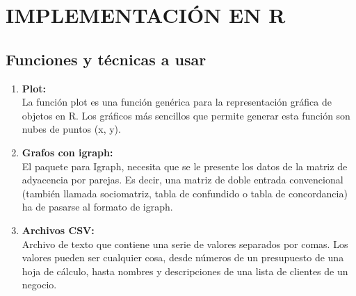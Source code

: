 \documentclass[journal]{IEEEtran}
\begin{document}
\section{\large\bf IMPLEMENTACI{\'O}N EN R}

\subsection{Funciones y t{\'e}cnicas a usar}

\begin{enumerate}
	\item{\bf Plot:}\\ La funci{\'o}n plot es una función gen{\'e}rica para la representaci{\'o}n gr{\'a}fica de objetos en R. Los gr{\'a}ficos m{\'a}s sencillos que permite generar esta funci{\'o}n son nubes de puntos (x, y).
	
	\item{\bf Grafos con igraph:}\\ El paquete para Igraph, necesita que se le presente los datos de la matriz de adyacencia por parejas. Es decir, una matriz de doble entrada convencional (tambi{\'e}n llamada sociomatriz, tabla de confundido o tabla de concordancia) ha de pasarse al formato de igraph.
	
	\item{\bf Archivos CSV:}\\ Archivo de texto que contiene una serie de valores separados por comas. Los valores pueden ser cualquier cosa, desde n{\'u}meros de un presupuesto de una hoja de c{\'a}lculo, hasta nombres y descripciones de una lista de clientes de un negocio.
	
\end{enumerate}
\end{document}
